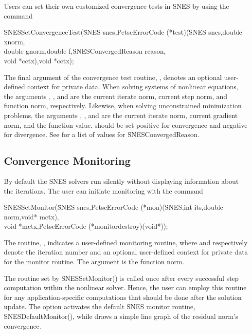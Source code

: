 Users can set their own customized convergence tests in SNES by using
the command 
\begin{tabbing}
  SNESSetConvergenceTest(\=SNES snes,PetscErrorCode (*test)(SNES snes,double xnorm,\\
                         \>double gnorm,double f,SNESConvergedReason reason,\\
                         \>void *cctx),void *cctx);
\end{tabbing}
The final argument of the convergence test routine, ,
denotes an optional user-defined context for private data.  When
solving systems of nonlinear equations, the arguments ,
, and  are the current iterate norm, current step
norm, and function norm, respectively.  Likewise, when solving
unconstrained minimization problems, the arguments , , and  are the current iterate norm, current gradient
norm, and the function value.  should be set positive
for convergence and negative for divergence. See 
for a list of values for SNESConvergedReason. 

\subsection{Convergence Monitoring}
\label{sec_snesmonitor}

By default the SNES solvers run silently without displaying information
about the iterations. The user can initiate monitoring with the
command  
\begin{tabbing}
  SNESSetMonitor(\=SNES snes,PetscErrorCode (*mon)(SNES,int its,double norm,void* mctx),\\
                 \>        void *mctx,PetscErrorCode (*monitordestroy)(void*));
\end{tabbing}
The routine, , indicates a user-defined monitoring routine,
where  and  respectively denote the iteration
number and an optional user-defined context for private data for the
monitor routine.  The argument  is the function norm.

The routine set by SNESSetMonitor() is called once after every
successful step computation within the nonlinear solver.  Hence, the
user can employ this routine for any application-specific computations
that should be done after the solution update. The option
  activates the default
SNES monitor routine, SNESDefaultMonitor(), 
while   draws
a simple line graph of the residual norm's convergence.

